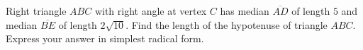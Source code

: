 Right triangle $ABC$ with right angle at vertex $C$ has median $\overline{AD}$ of length $5$ and median $\overline{BE}$ of length $2\sqrt{10}$. Find the length of the hypotenuse of triangle $ABC$. Express your answer in simplest radical form.
